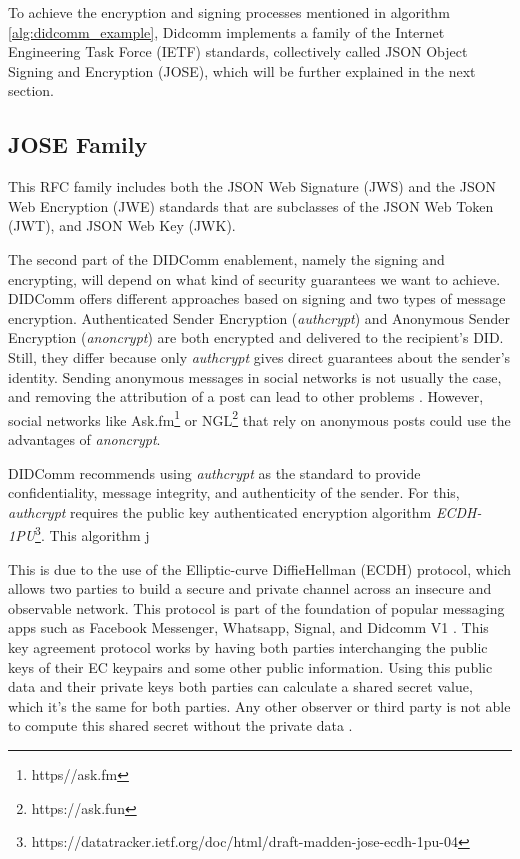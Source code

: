 To achieve the encryption and signing processes mentioned in algorithm \ref{alg:didcomm_example}, Didcomm implements a family of the Internet Engineering Task Force (IETF) standards, collectively called JSON Object Signing and Encryption (JOSE), which will be further explained in the next section. 

\subsection{JOSE Family}

This RFC family includes both the JSON Web Signature (JWS) and the JSON Web Encryption (JWE) standards that are subclasses of the JSON Web Token (JWT), and JSON Web Key (JWK).


The second part of the DIDComm enablement, namely the signing and encrypting, will depend on what kind of security guarantees we want to achieve. DIDComm offers different approaches based on signing and two types of message encryption. Authenticated Sender Encryption (\emph{authcrypt}) and Anonymous Sender Encryption (\emph{anoncrypt}) are both encrypted and delivered to the recipient's DID. Still, they differ because only \emph{authcrypt} gives direct guarantees about the sender's identity. Sending anonymous messages in social networks is not usually the case, and removing the attribution of a post can lead to other problems \cite{martin_2022}. However, social networks like Ask.fm\footnote{https//ask.fm} or NGL\footnote{https://ask.fun} that rely on anonymous posts could use the advantages of \emph{anoncrypt}.

DIDComm recommends using \emph{authcrypt} as the standard to provide confidentiality, message integrity, and authenticity of the sender. For this, \emph{authcrypt} requires the public key authenticated encryption algorithm \emph{ECDH-1PU}\footnote{https://datatracker.ietf.org/doc/html/draft-madden-jose-ecdh-1pu-04}. This algorithm j

This is due to the use of the 
Elliptic-curve Diffie\-Hellman (ECDH) protocol, which allows two parties to build a secure and private channel across an insecure and observable network. This protocol is part of the foundation of popular messaging apps such as Facebook Messenger, Whatsapp, Signal, and Didcomm V1 \cite{shaaban_2021}. This key agreement protocol works by having both parties interchanging the public keys of their EC keypairs and some other public information. Using this public data and their private keys both parties can calculate a shared secret value, which it's the same for both parties. Any other observer or third party is not able to compute this shared secret without the private data \cite{5972416}. 


